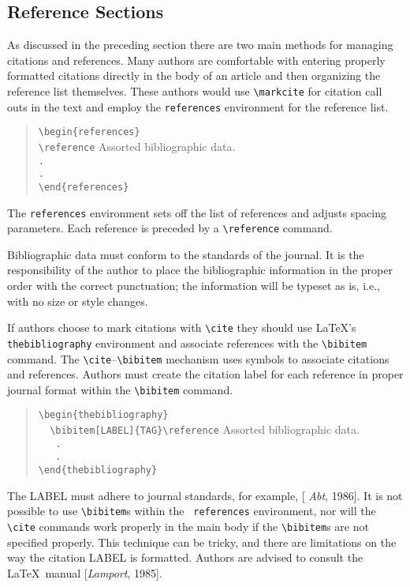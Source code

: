 \subsection{Reference Sections}

As discussed in the preceding section there are two main methods 
for managing citations and references.  Many authors are comfortable 
with entering properly formatted citations directly in the body of an 
article and then organizing the reference list themselves.  These 
authors would use \verb"\markcite" for citation call outs in the text 
and employ the {\tt references} environment for the reference list.  
\begin{quote}
\verb"\begin{references}"\\
\verb"\reference" Assorted bibliographic data. \\
\verb"."\\
\verb"."\\
\verb"\end{references}"
\end{quote}
The {\tt references} environment sets off the list of references 
and adjusts spacing parameters.  Each reference is preceded by a 
\verb"\reference" command.  

Bibliographic data must conform to the standards of the journal.  It is 
the responsibility of the author to place the bibliographic information 
in the proper order with the correct punctuation; the information will 
be typeset as is, i.e., with no size or style changes.

If authors choose to mark citations with \verb"\cite" they should use
\LaTeX's {\tt thebibliography} environment and associate references 
with the \verb"\bibitem" command.  The \verb"\cite"--\verb"\bibitem" 
mechanism uses symbols to associate citations and references.  Authors 
must create the citation label for each reference in proper journal 
format within the \verb"\bibitem" command.
\begin{center}
\begin{quote}
\verb"\begin{thebibliography}"\\
\verb"  \bibitem[LABEL]{TAG}"\verb"\reference" Assorted bibliographic data. \\
\verb"   ."\\
\verb"   ."\\
\verb"\end{thebibliography}"
\end{quote}
\end{center}
The {\small LABEL} must adhere to journal standards, for example, [{\it 
Abt}, 1986].  It is not possible to use \verb"\bibitem"s within the {\tt 
references} environment, nor will the \verb"\cite" commands work properly 
in the main body if the \verb"\bibitem"s are not specified properly.  This 
technique can be tricky, and there are limitations on the way the citation 
{\small LABEL} is formatted.  Authors are advised to consult the \LaTeX\ 
manual [{\it Lamport}, 1985].

